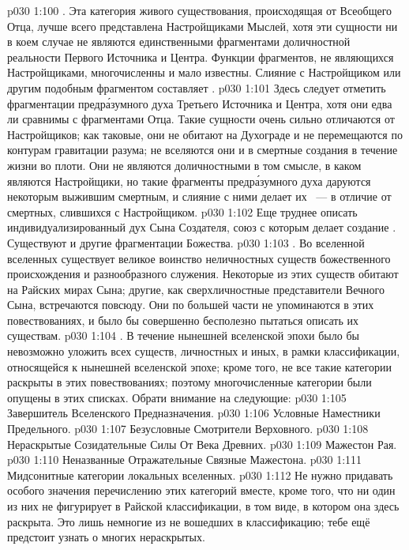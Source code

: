 \vs p030 1:100 . Эта категория живого существования, происходящая от Всеобщего Отца, лучше всего представлена Настройщиками Мыслей, хотя эти сущности ни в коем случае не являются единственными фрагментами доличностной реальности Первого Источника и Центра. Функции фрагментов, не являющихся Настройщиками, многочисленны и мало известны. Слияние с Настройщиком или другим подобным фрагментом составляет .
\vs p030 1:101 Здесь следует отметить фрагментации предр\'азумного духа Третьего Источника и Центра, хотя они едва ли сравнимы с фрагментами Отца. Такие сущности очень сильно отличаются от Настройщиков; как таковые, они не обитают на Духограде и не перемещаются по контурам гравитации разума; не вселяются они и в смертные создания в течение жизни во плоти. Они не являются доличностными в том смысле, в каком являются Настройщики, но такие фрагменты предр\'азумного духа даруются некоторым выжившим смертным, и слияние с ними делает их ~--- в отличие от смертных, слившихся с Настройщиком.
\vs p030 1:102 Еще труднее описать индивидуализированный дух Сына Создателя, союз с которым делает создание . Существуют и другие фрагментации Божества.
\vs p030 1:103 . Во вселенной вселенных существует великое воинство неличностных существ божественного происхождения и разнообразного служения. Некоторые из этих существ обитают на Райских мирах Сына; другие, как сверхличностные представители Вечного Сына, встречаются повсюду. Они по большей части не упоминаются в этих повествованиях, и было бы совершенно бесполезно пытаться описать их  существам.
\vs p030 1:104 . В течение нынешней вселенской эпохи было бы невозможно уложить всех существ, личностных и иных, в рамки классификации, относящейся к нынешней вселенской эпохе; кроме того, не все такие категории раскрыты в этих повествованиях; поэтому многочисленные категории были опущены в этих списках. Обрати внимание на следующие:
\vs p030 1:105 Завершитель Вселенского Предназначения.
\vs p030 1:106 Условные Наместники Предельного.
\vs p030 1:107 Безусловные Смотрители Верховного.
\vs p030 1:108 Нераскрытые Созидательные Силы От Века Древних.
\vs p030 1:109 Мажестон Рая.
\vs p030 1:110 Неназванные Отражательные Связные Мажестона.
\vs p030 1:111 Мидсонитные категории локальных вселенных.
\vs p030 1:112 \pc Не нужно придавать особого значения перечислению этих категорий вместе, кроме того, что ни один из них не фигурирует в Райской классификации, в том виде, в котором она здесь раскрыта. Это лишь немногие из не вошедших в классификацию; тебе ещё предстоит узнать о многих нераскрытых.

